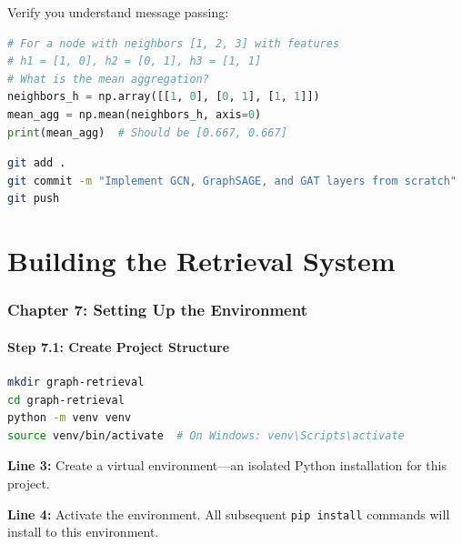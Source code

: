 \documentclass[12pt,a4paper]{article}
\begin{document}
\begin{checkpoint}
Verify you understand message passing:
\begin{lstlisting}[language=Python]
# For a node with neighbors [1, 2, 3] with features
# h1 = [1, 0], h2 = [0, 1], h3 = [1, 1]
# What is the mean aggregation?
neighbors_h = np.array([[1, 0], [0, 1], [1, 1]])
mean_agg = np.mean(neighbors_h, axis=0)
print(mean_agg)  # Should be [0.667, 0.667]
\end{lstlisting}
\end{checkpoint}

\begin{gitcommit}
\begin{lstlisting}[language=bash]
git add .
git commit -m "Implement GCN, GraphSAGE, and GAT layers from scratch"
git push
\end{lstlisting}
\end{gitcommit}

\part{Building the Retrieval System}

\section{Chapter 7: Setting Up the Environment}

\subsection{Step 7.1: Create Project Structure}

\begin{lstlisting}[language=bash,caption={Create project}]
mkdir graph-retrieval
cd graph-retrieval
python -m venv venv
source venv/bin/activate  # On Windows: venv\Scripts\activate
\end{lstlisting}

\begin{explanation}
\textbf{Line 3:} Create a virtual environment---an isolated Python installation for this project.

\textbf{Line 4:} Activate the environment. All subsequent \texttt{pip install} commands will install to this environment.
\end{explanation}
\end{document}
